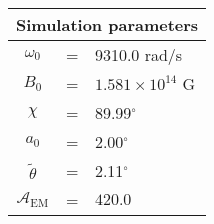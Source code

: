  \begin{tabular}{ccl}
\multicolumn{3}{c}{Simulation parameters} \\
\hline
$\omega_0$  &=& 9310.0 rad/s\\
$B_0$  &=& $ 1.581\times 10^{14} $ G \\
$\chi$  &=& 89.99$^{\circ}$ \\
$a_0$ &=& 2.00$^{\circ}$ \\
$\tilde{\theta}$ &= & 2.11$^{\circ}$ \\
$\mathcal{A}_{\mathrm{EM}}$ &= & $420.0$
\end{tabular}
    